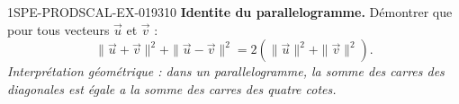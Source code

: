 \begin{exercice}{1SPE-PRODSCAL-EX-019}{3}{10}
\textbf{Identite du parallelogramme.}
Démontrer que pour tous vecteurs $\vec{u}$ et $\vec{v}$ :
\[
\|\vec{u} + \vec{v}\|^2 + \|\vec{u} - \vec{v}\|^2 = 2\left(\|\vec{u}\|^2 + \|\vec{v}\|^2\right).
\]
\textit{Interprétation géométrique : dans un parallelogramme, la somme des carres des diagonales est égale a la somme des carres des quatre cotes.}
\end{exercice}
